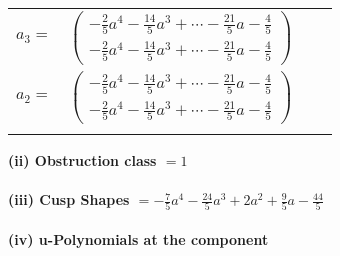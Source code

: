 \documentclass[1p]{elsarticle_modified}
\theoremstyle{definition}
\begin{document}
\begin{tabular}{m{7pt} m{180pt} m{7pt} m{180pt} }
\flushright $a_{3}=$&$\begin{pmatrix}-\frac{2}{5} a^4-\frac{14}{5} a^3+\cdots-\frac{21}{5} a-\frac{4}{5}\\-\frac{2}{5} a^4-\frac{14}{5} a^3+\cdots-\frac{21}{5} a-\frac{4}{5}\end{pmatrix}$ \\
\flushright $a_{2}=$&$\begin{pmatrix}-\frac{2}{5} a^4-\frac{14}{5} a^3+\cdots-\frac{21}{5} a-\frac{4}{5}\\-\frac{2}{5} a^4-\frac{14}{5} a^3+\cdots-\frac{21}{5} a-\frac{4}{5}\end{pmatrix}$\\&\end{tabular}
\flushleft \textbf{(ii) Obstruction class $= 1$}\\~\\
\flushleft \textbf{(iii) Cusp Shapes $= -\frac{7}{5} a^4-\frac{24}{5} a^3+2 a^2+\frac{9}{5} a-\frac{44}{5}$}\\~\\
\newpage\renewcommand{\arraystretch}{1}
\flushleft \textbf{(iv) u-Polynomials at the component}\newline \\
\end{document}

